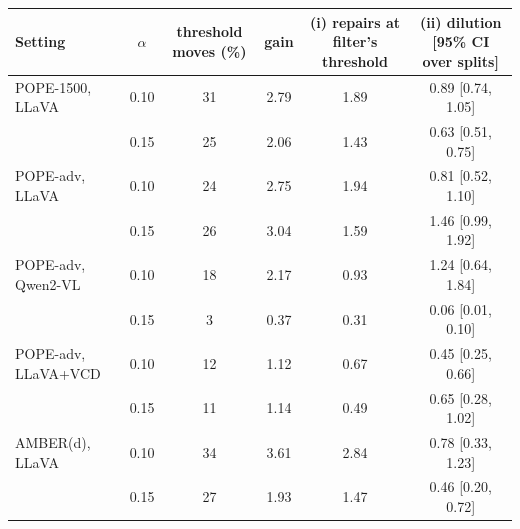 \begin{tabular}{lccccc}
\toprule
Setting & $\alpha$ & threshold moves (\%) & gain & (i) repairs at filter's threshold & (ii) dilution [95\% CI over splits]\\
\midrule
POPE-1500, LLaVA & 0.10 & 31 & 2.79 & 1.89 & 0.89 [0.74, 1.05]\\
 & 0.15 & 25 & 2.06 & 1.43 & 0.63 [0.51, 0.75]\\
\addlinespace
POPE-adv, LLaVA & 0.10 & 24 & 2.75 & 1.94 & 0.81 [0.52, 1.10]\\
 & 0.15 & 26 & 3.04 & 1.59 & 1.46 [0.99, 1.92]\\
\addlinespace
POPE-adv, Qwen2-VL & 0.10 & 18 & 2.17 & 0.93 & 1.24 [0.64, 1.84]\\
 & 0.15 & 3 & 0.37 & 0.31 & 0.06 [0.01, 0.10]\\
\addlinespace
POPE-adv, LLaVA+VCD & 0.10 & 12 & 1.12 & 0.67 & 0.45 [0.25, 0.66]\\
 & 0.15 & 11 & 1.14 & 0.49 & 0.65 [0.28, 1.02]\\
\addlinespace
AMBER(d), LLaVA & 0.10 & 34 & 3.61 & 2.84 & 0.78 [0.33, 1.23]\\
 & 0.15 & 27 & 1.93 & 1.47 & 0.46 [0.20, 0.72]\\
\bottomrule
\end{tabular}
